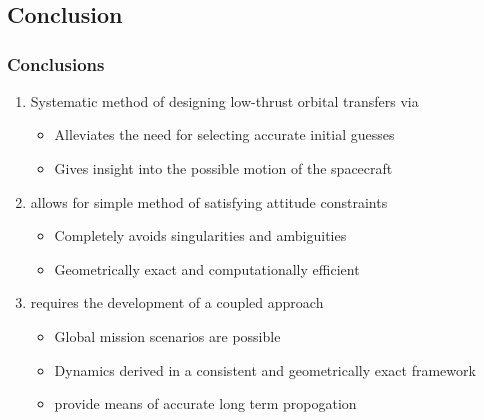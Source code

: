 

\section*{}
\subsection*{Conclusion}

\begin{frame} %
\frametitle{Conclusions}
  \begin{enumerate}[<+->]
    \item Systematic method of designing low-thrust orbital transfers via 
    \begin{itemize}
        \item Alleviates the need for selecting accurate initial guesses 
        \item Gives insight into the possible motion of the spacecraft
    \end{itemize}
    \item {} allows for simple method of satisfying attitude constraints
    \begin{itemize}
        \item Completely avoids singularities and ambiguities
        \item Geometrically exact and computationally efficient
    \end{itemize}
    \item {} requires the development of a coupled approach 
    \begin{itemize}
        \item Global mission scenarios are possible
        \item Dynamics derived in a consistent and geometrically exact framework
        \item {} provide means of accurate long term propogation
    \end{itemize}

  \end{enumerate}
  
\end{frame}   %


